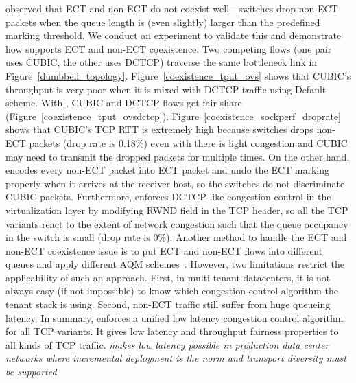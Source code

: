 \cite{judd2015nsdi,wu2012tuning} observed that ECT and non-ECT do not coexist well---switches
drop non-ECT packets when the queue length is (even slightly) larger than the predefined
marking threshold.
We conduct an experiment to validate this and demonstrate how \acdc{} supports ECT and non-ECT coexistence.
Two competing flows (one pair uses CUBIC, the other uses DCTCP) traverse the same bottleneck link in Figure~\ref{dumbbell_topology}.
Figure~\ref{coexistence_tput_ovs} shows that CUBIC's throughput is very poor when it is
mixed with DCTCP traffic using Default scheme. With \acdc{}, CUBIC and DCTCP flows get fair share (Figure~\ref{coexistence_tput_ovsdctcp}).
Figure~\ref{coexistence_sockperf_droprate} shows that CUBIC's TCP RTT is extremely high
because switches drops non-ECT packets (drop rate is 0.18\%) even with there is light congestion 
and CUBIC may need to transmit the dropped
packets for multiple times.
On the other hand, \acdc{} encodes every non-ECT packet into ECT packet and
undo the ECT marking properly when it arrives at the receiver host, so the switches do not discriminate
CUBIC packets. Furthermore, \acdc{} enforces DCTCP-like congestion control in the virtualization layer
by modifying RWND field in the TCP header, so all the TCP variants react to the extent of network
congestion such that the queue occupancy in the switch is small (drop rate is 0\%).
Another method to handle the ECT and non-ECT coexistence issue is to
put ECT and non-ECT flows into different queues and apply different AQM schemes~\cite{judd2015nsdi}.
However, two limitations restrict the applicability of such an approach.
First, in multi-tenant datacenters, it is not always easy (if not impossible) to
know which congestion control algorithm the tenant stack is using.
Second, non-ECT traffic still suffer from huge queueing latency.
In summary, \acdc{} enforces a unified low latency congestion control algorithm for all TCP variants.
It gives low latency and throughput fairness properties to all kinds of TCP traffic.
\emph{\acdc{} makes low latency possible in production data center networks where
incremental deployment is the norm and transport diversity must be supported}.

